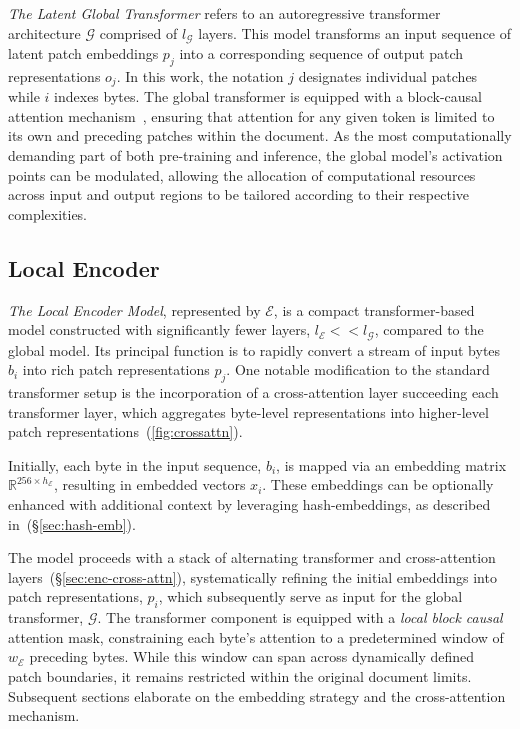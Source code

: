 \textit{The Latent Global Transformer} refers to an autoregressive transformer architecture $\mathcal{G}$ comprised of $l_{\mathcal{G}}$ layers. This model transforms an input sequence of latent patch embeddings $p_j$ into a corresponding sequence of output patch representations $o_j$. In this work, the notation $j$ designates individual patches while $i$ indexes bytes. The global transformer is equipped with a block-causal attention mechanism~\citep{dubey2024llama}, ensuring that attention for any given token is limited to its own and preceding patches within the document. As the most computationally demanding part of both pre-training and inference, the global model’s activation points can be modulated, allowing the allocation of computational resources across input and output regions to be tailored according to their respective complexities.

\subsection{Local Encoder}
\label{section:local}

\textit{The Local Encoder Model}, represented by $\mathcal{E}$, is a compact transformer-based model constructed with significantly fewer layers, $l_{\mathcal{E}} << l_{\mathcal{G}}$, compared to the global model. Its principal function is to rapidly convert a stream of input bytes $b_i$ into rich patch representations $p_j$. One notable modification to the standard transformer setup is the incorporation of a cross-attention layer succeeding each transformer layer, which aggregates byte-level representations into higher-level patch representations~(\autoref{fig:crossattn}).

Initially, each byte in the input sequence, $b_i$, is mapped via an embedding matrix $\mathbb{R}^{256 \times h_{\mathcal{E}}}$, resulting in embedded vectors $x_i$. These embeddings can be optionally enhanced with additional context by leveraging hash-embeddings, as described in~(\S\ref{sec:hash-emb}).

The model proceeds with a stack of alternating transformer and cross-attention layers~(\S\ref{sec:enc-cross-attn}), systematically refining the initial embeddings into patch representations, $p_i$, which subsequently serve as input for the global transformer, $\mathcal{G}$. The transformer component is equipped with a \textit{local block causal} attention mask, constraining each byte's attention to a predetermined window of $w_{\mathcal{E}}$ preceding bytes. While this window can span across dynamically defined patch boundaries, it remains restricted within the original document limits. Subsequent sections elaborate on the embedding strategy and the cross-attention mechanism.

